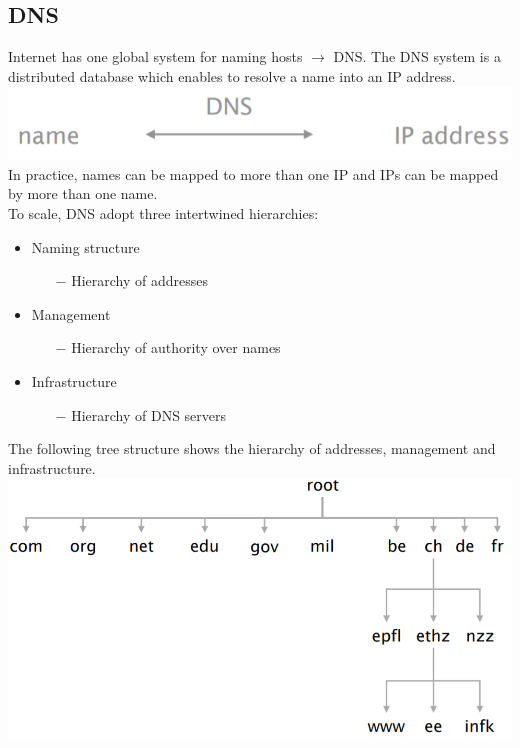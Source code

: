 \documentclass[a4paper, fontsize=8pt, landscape, DIV=1]{scrartcl}
\begin{document}
\begin{multicols*}{4}
		\subsection{DNS}
		Internet has one global system for naming hosts $\rightarrow$ DNS. The DNS system is a distributed database which enables to resolve a name into an IP address.\\
		\includegraphics[width=\columnwidth]{images/Application_Layer/dns_ip.png}
		In practice, names can be mapped to more than one IP and IPs can be mapped by more than one name.\\
		To scale, DNS adopt three intertwined hierarchies: 
		\begin{itemize}[noitemsep]
			\item Naming structure
			\begin{itemize}
				\item[$-$] Hierarchy of addresses
			\end{itemize}
			\item Management
			\begin{itemize}
				\item[$-$] Hierarchy of authority over names 
			\end{itemize}
			\item Infrastructure
			\begin{itemize}
				\item[$-$] Hierarchy of DNS servers
			\end{itemize}
		\end{itemize}
		The following tree structure shows the hierarchy of addresses, management and infrastructure.   
		\includegraphics[width=\columnwidth]{images/Application_Layer/dns_tree.png}

\end{multicols*}
\end{document}

